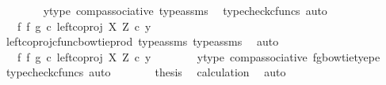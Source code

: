 \begin{isabellebody}
\ \ \ \ \ \ \isamarkupfalse%
\ y{\isacharunderscore}{\kern0pt}type{}\ comp{\isacharunderscore}{\kern0pt}associative{}\ type{\isacharunderscore}{\kern0pt}assms{\isacharparenleft}{\kern0pt}{}{\isacharparenright}{\kern0pt}\ \isamarkupfalse%
\ {\isacharparenleft}{\kern0pt}typecheck{\isacharunderscore}{\kern0pt}cfuncs{\isacharcomma}{\kern0pt}\ auto{\isacharparenright}{\kern0pt}\isanewline
\ \ \ \ \isamarkupfalse%
\ \isamarkupfalse%
\ {\isachardoublequoteopen}{\isachardot}{\kern0pt}{\isachardot}{\kern0pt}{\isachardot}{\kern0pt}\ {\isacharequal}{\kern0pt}\ {\isacharparenleft}{\kern0pt}{\isacharparenleft}{\kern0pt}f\ {\isasymbowtie}\isactrlsub f\ g{\isacharparenright}{\kern0pt}\ {\isasymcirc}\isactrlsub c\ left{\isacharunderscore}{\kern0pt}coproj\ X\ Z{\isacharparenright}{\kern0pt}\ {\isasymcirc}\isactrlsub c\ y{\isachardoublequoteclose}\isanewline
\ \ \ \ \ \ \isamarkupfalse%
\ left{\isacharunderscore}{\kern0pt}coproj{\isacharunderscore}{\kern0pt}cfunc{\isacharunderscore}{\kern0pt}bowtie{\isacharunderscore}{\kern0pt}prod\ type{\isacharunderscore}{\kern0pt}assms{\isacharparenleft}{\kern0pt}{}{\isacharparenright}{\kern0pt}\ type{\isacharunderscore}{\kern0pt}assms{\isacharparenleft}{\kern0pt}{}{\isacharparenright}{\kern0pt}\ \isamarkupfalse%
\ auto\isanewline
\ \ \ \ \isamarkupfalse%
\ \isamarkupfalse%
\ {\isachardoublequoteopen}{\isachardot}{\kern0pt}{\isachardot}{\kern0pt}{\isachardot}{\kern0pt}\ {\isacharequal}{\kern0pt}\ {\isacharparenleft}{\kern0pt}f\ {\isasymbowtie}\isactrlsub f\ g{\isacharparenright}{\kern0pt}\ {\isasymcirc}\isactrlsub c\ left{\isacharunderscore}{\kern0pt}coproj\ X\ Z\ {\isasymcirc}\isactrlsub c\ y{\isachardoublequoteclose}\isanewline
\ \ \ \ \ \ \isamarkupfalse%
\ y{\isacharunderscore}{\kern0pt}type{}\ comp{\isacharunderscore}{\kern0pt}associative{}\ fg{\isacharunderscore}{\kern0pt}bowtie{\isacharunderscore}{\kern0pt}tyepe\ \isamarkupfalse%
\ {\isacharparenleft}{\kern0pt}typecheck{\isacharunderscore}{\kern0pt}cfuncs{\isacharcomma}{\kern0pt}\ auto{\isacharparenright}{\kern0pt}\isanewline
\ \ \ \ \isamarkupfalse%
\ \isamarkupfalse%
\ {\isacharquery}{\kern0pt}thesis\ \isamarkupfalse%
\ calculation\ \isamarkupfalse%
\ auto\isanewline
\ \ \isamarkupfalse%
\isanewline
\ \ \isamarkupfalse%
\ \isamarkupfalse%

\end{isabellebody}
